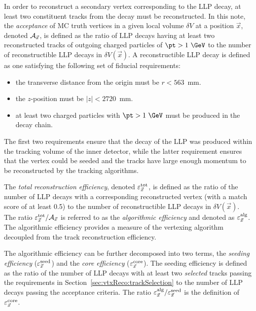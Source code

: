 \documentclass[PUB,UKenglish, texlive=2018]{\ATLASLATEXPATH atlasdoc}
\begin{document}
In order to reconstruct a secondary vertex corresponding to the LLP decay, at least two constituent tracks from the decay must be reconstructed. %
In this note, the \emph{acceptance} of MC truth vertices in a given local volume $\delta V$ at a position $\vec{x}$, denoted ${\cal A}_{\vec{x}}$, is defined as the ratio of LLP decays having at least two reconstructed tracks of outgoing charged particles of $\pt>1~\GeV$ to the number of reconstructible LLP decays in $\delta V(\vec{x})$. 
A reconstructible LLP decay is defined as one satisfying the following set of fiducial requirements:

\begin{itemize}
\item the transverse distance from the origin must be $r<563$~mm.
\item the $z$-position must be $|z|<2720$~mm.
\item at least two charged particles with $\pt>1~\GeV$ must be produced in the decay chain.
\end{itemize}

The first two requirements ensure that the decay of the LLP was produced within the tracking volume of the inner detector,
while the latter requirement ensures that the vertex could be seeded and the tracks have large enough momentum to be reconstructed by the tracking algorithms.

The \emph{total reconstruction efficiency}, denoted $\varepsilon_{\vec{x}}^{\rm tot}$, 
is defined as the ratio of %
the number of LLP decays with a corresponding reconstructed vertex (with a match score of at least 0.5) to the number of reconstructible LLP decays in $\delta V(\vec{x})$. 
The ratio $\varepsilon_{\vec{x}}^{\rm tot}/{\cal A}_{\vec{x}}$ is referred to as the \emph{algorithmic efficiency} and denoted as $\varepsilon_{\vec{x}}^{\rm alg}$. 
The algorithmic efficiency provides a measure of the vertexing algorithm decoupled from the track reconstruction efficiency.

The algorithmic efficiency can be further decomposed into two terms, the \emph{seeding efficiency} ($\varepsilon_{\vec{x}}^{\rm seed}$) and the \emph{core efficiency} ($\varepsilon_{\vec{x}}^{\rm core}$). 
The seeding efficiency is defined as the ratio of the number of LLP decays with at least two \emph{selected} tracks passing the requirements in Section~\ref{sec:vtxReco:trackSelection} to the number of LLP decays passing the acceptance criteria. 
The ratio $\varepsilon_{\vec{x}}^{\rm alg}/\varepsilon_{\vec{x}}^{\rm seed}$ is the definition of $\varepsilon_{\vec{x}}^{\rm core}$.
\end{document}
